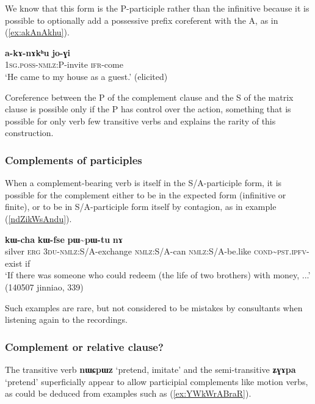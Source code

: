 \documentclass[oneside,a4paper,11pt]{article}
\newcommand{\ipa}[1]{\textbf{\phon#1}} %
\newcommand{\jpg}[2]{\ipa{#1} `#2'} %
\newcommand{\tld}{\textasciitilde{}}
\begin{document}
We know that this form is the P-participle rather than the infinitive because it is possible to optionally add a possessive prefix coreferent with the A, as in (\ref{ex:akAnAkhu}).

\begin{exe}
\ex \label{ex:akAnAkhu}
\gll 
\ipa{a-kɤ-nɤkʰu} 	\ipa{jo-ɣi}  \\
 \textsc{1sg.poss-nmlz:P}-invite \textsc{ifr}-come \\
\glt `He came to my house as a guest.' (elicited)
\end{exe}

Coreference between the P of the complement clause and the S of the matrix clause is possible only if the P has control over the action, something that is possible for only verb few transitive verbs and explains the rarity of this construction. 
    
\subsubsection{Complements of participles}
When a complement-bearing verb is itself in the S/A-participle form, it is possible for the complement either to be in the expected form (infinitive or finite), or to be in S/A-participle form itself by contagion, as in example (\ref{ndZikWsAndu}).

\begin{exe}
\ex \label{ndZikWsAndu}
\gll [\ipa{rŋɯl} 	\ipa{kɯ} 	\ipa{ndʑi-kɯ-sɤndu}] 	\ipa{kɯ-cha} 	\ipa{kɯ-fse} 	\ipa{pɯ\tld{}pɯ-tu} 	\ipa{nɤ} \\
silver \textsc{erg} \textsc{3du-nmlz}:S/A-exchange \textsc{nmlz}:S/A-can \textsc{nmlz}:S/A-be.like 
\textsc{cond}\tld{}\textsc{pst.ipfv}-exist if \\
\glt `If there was someone who could redeem (the life of two brothers) with money, ...' (140507 jinniao, 339)
\end{exe}

Such examples are rare, but not considered to be mistakes by consultants when listening again to the recordings.

\subsubsection{Complement or relative clause?} \label{sec:relative.q}
The transitive verb \jpg{nɯɕpɯz}{pretend, imitate} and the semi-transitive \jpg{ʑɣɤpa}{pretend} superficially appear to allow participial complements like motion verbs, as could be deduced from examples such as (\ref{ex:YWkWrABraR}). 
\end{document}
